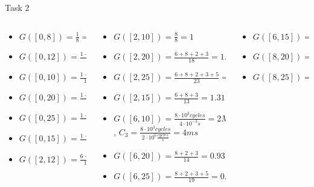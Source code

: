 \begin{frame}[allowframebreaks]{Task 2}{}
\begin{solutionnoinc}
\begin{ganttchart}
    \end{ganttchart}
  \end{solutionnoinc}
  \begin{solutionnoinc}
    \tiny
    \begin{columns}
      \begin{column}{0.33\textwidth}
        \begin{itemize}
          \item $G([0, 8]) = \frac{1}{8} = 0.125$
          \item $G([0, 12]) = \frac{1+6+8}{12} = 1.25$
          \item $G([0, 10]) = \frac{1+8}{10} = 0.9$
          \item $G([0, 20]) = \frac{1+6+8+2+3}{20} = 1$
          \item $G([0, 25]) = \frac{1+6+8+2+3+5}{25} = 1$
          \item $G([0, 15]) = \frac{1+6+8+3}{15} = 1.2$
          \item $G([2, 12]) = \frac{6+8}{10} = 1.4$
        \end{itemize}
      \end{column}
      \begin{column}{0.33\textwidth}
        \begin{itemize}
          \item $G([2, 10]) = \frac{8}{8} = 1$
          \item $G([2, 20]) = \frac{6+8+2+3}{18} = 1.06$
          \item $G([2, 25]) = \frac{6+8+2+3+5}{23} = 1.04$
          \item $G([2, 15]) = \frac{6+8+3}{13} = 1.31$
          \item $\boxed{G([6, 10]) = \frac{8 \cdot 10^3 cycles}{4 \cdot 10^{-3}s} = 2 MHz}$, $C_3 = \frac{8 \cdot 10^3 cycles}{2 \cdot 10^6 \frac{cycles}{s}} = 4ms$
          \item $G([6, 20]) = \frac{8+2+3}{14} = 0.93$
          \item $G([6, 25]) = \frac{8+2+3+5}{19} = 0.95$
        \end{itemize}
      \end{column}
      \begin{column}{0.33\textwidth}
        \begin{itemize}
          \item $G([6, 15]) = \frac{8+3}{9} = 1.22$
          \item $G([8, 20]) = \frac{2+3}{12} = 0.42$
          \item $G([8, 25]) = \frac{2+3+5}{17} = 0.59$

\end{itemize}
\end{column}
\end{columns}
\end{solutionnoinc}
\end{frame}
